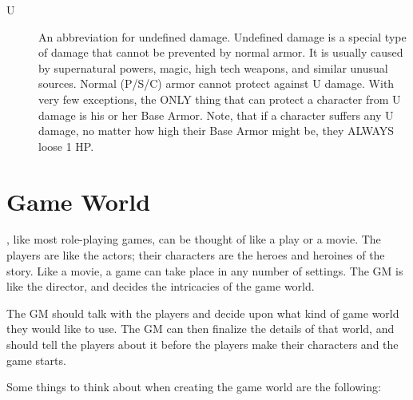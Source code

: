 \documentclass[twoside]{book}
\begin{document}
\begin{description}
  \item[ U ] 
    {  
     An abbreviation for undefined damage. Undefined
                 damage is a special type of damage that cannot be
                 prevented by normal armor. It is usually caused by
                 supernatural powers, magic, high tech weapons, and
                 similar unusual sources. Normal (P/S/C) armor cannot
                 protect against U damage. With very few exceptions, the
                 ONLY thing that can protect a character from U damage is
                 his or her Base Armor. Note, that if a character suffers
                 any U damage, no matter how high their Base Armor might
                 be, they ALWAYS loose 1 HP. 
    }
  
\end{description}
  
    

\section{Game World}
    
    {  
    \APATHY{}, like most role-playing games, can be
            thought of like a play or a movie. The players are like the
            actors; their characters are the heroes and heroines of the
            story. Like a movie, a game can take place in any number of
            settings. The GM is like the director, and decides the
            intricacies of the game world.
          
    }
  
    {  
    The GM should talk with the players and decide upon
             what kind of game world they would like to use. The GM can
             then finalize the details of that world, and should tell the
             players about it before the players make their characters
             and the game starts. 
    }
  
    {  
    Some things to think about when creating the game
             world are the following: 
    }
  
\end{document}
